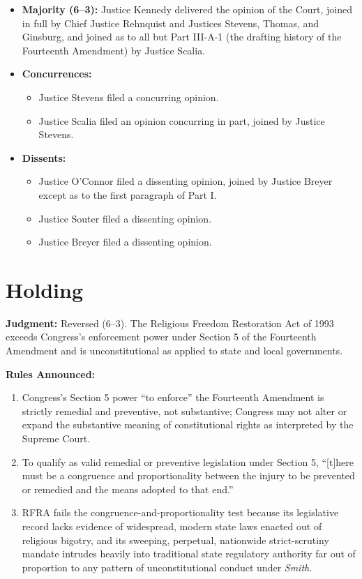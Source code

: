\documentclass[12pt]{article}
\begin{document}
\begin{itemize}
  \item \textbf{Majority (6--3):} Justice Kennedy delivered the opinion of the Court, joined in full by Chief Justice Rehnquist and Justices Stevens, Thomas, and Ginsburg, and joined as to all but Part III-A-1 (the drafting history of the Fourteenth Amendment) by Justice Scalia.
  \item \textbf{Concurrences:}
  \begin{itemize}
    \item Justice Stevens filed a concurring opinion.
    \item Justice Scalia filed an opinion concurring in part, joined by Justice Stevens.
  \end{itemize}
  \item \textbf{Dissents:}
  \begin{itemize}
    \item Justice O'Connor filed a dissenting opinion, joined by Justice Breyer except as to the first paragraph of Part I.
    \item Justice Souter filed a dissenting opinion.
    \item Justice Breyer filed a dissenting opinion.
  \end{itemize}
\end{itemize}

\section{Holding}

\textbf{Judgment:} Reversed (6--3). The Religious Freedom Restoration Act of 1993 exceeds Congress's enforcement power under Section 5 of the Fourteenth Amendment and is unconstitutional as applied to state and local governments.

\textbf{Rules Announced:}
\begin{enumerate}
  \item Congress's Section 5 power ``to enforce'' the Fourteenth Amendment is strictly remedial and preventive, not substantive; Congress may not alter or expand the substantive meaning of constitutional rights as interpreted by the Supreme Court.
  \item To qualify as valid remedial or preventive legislation under Section 5, ``[t]here must be a congruence and proportionality between the injury to be prevented or remedied and the means adopted to that end.''
  \item RFRA fails the congruence-and-proportionality test because its legislative record lacks evidence of widespread, modern state laws enacted out of religious bigotry, and its sweeping, perpetual, nationwide strict-scrutiny mandate intrudes heavily into traditional state regulatory authority far out of proportion to any pattern of unconstitutional conduct under \textit{Smith}.
\end{enumerate}
\end{document}
